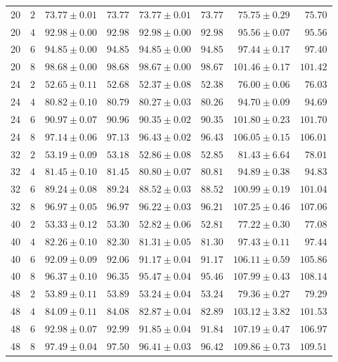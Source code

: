 \documentclass{article}
\theoremstyle{definition}
\theoremstyle{remark}
\begin{document}
\begin{table}[ht]
\begin{tabular}{llrrrrrr}
    20 & $2$ & $73.77 \pm 0.01$ & $73.77$ & $73.77 \pm 0.01$ & $73.77$ & $75.75 \pm 0.29$ & $75.70$ \\
    20 & $4$ & $92.98 \pm 0.00$ & $92.98$ & $92.98 \pm 0.00$ & $92.98$ & $95.56 \pm 0.07$ & $95.56$ \\
    20 & $6$ & $94.85 \pm 0.00$ & $94.85$ & $94.85 \pm 0.00$ & $94.85$ & $97.44 \pm 0.17$ & $97.40$ \\
    20 & $8$ & $98.68 \pm 0.00$ & $98.68$ & $98.67 \pm 0.00$ & $98.67$ & $101.46 \pm 0.17$ & $101.42$ \\
    24 & $2$ & $52.65 \pm 0.11$ & $52.68$ & $52.37 \pm 0.08$ & $52.38$ & $76.00 \pm 0.06$ & $76.03$ \\
    24 & $4$ & $80.82 \pm 0.10$ & $80.79$ & $80.27 \pm 0.03$ & $80.26$ & $94.70 \pm 0.09$ & $94.69$ \\
    24 & $6$ & $90.97 \pm 0.07$ & $90.96$ & $90.35 \pm 0.02$ & $90.35$ & $101.80 \pm 0.23$ & $101.70$ \\
    24 & $8$ & $97.14 \pm 0.06$ & $97.13$ & $96.43 \pm 0.02$ & $96.43$ & $106.05 \pm 0.15$ & $106.01$ \\
    32 & $2$ & $53.19 \pm 0.09$ & $53.18$ & $52.86 \pm 0.08$ & $52.85$ & $81.43 \pm 6.64$ & $78.01$ \\
    32 & $4$ & $81.45 \pm 0.10$ & $81.45$ & $80.80 \pm 0.07$ & $80.81$ & $94.89 \pm 0.38$ & $94.83$ \\
    32 & $6$ & $89.24 \pm 0.08$ & $89.24$ & $88.52 \pm 0.03$ & $88.52$ & $100.99 \pm 0.19$ & $101.04$ \\
    32 & $8$ & $96.97 \pm 0.05$ & $96.97$ & $96.22 \pm 0.03$ & $96.21$ & $107.25 \pm 0.46$ & $107.06$ \\
    40 & $2$ & $53.33 \pm 0.12$ & $53.30$ & $52.82 \pm 0.06$ & $52.81$ & $77.22 \pm 0.30$ & $77.08$ \\
    40 & $4$ & $82.26 \pm 0.10$ & $82.30$ & $81.31 \pm 0.05$ & $81.30$ & $97.43 \pm 0.11$ & $97.44$ \\
    40 & $6$ & $92.09 \pm 0.09$ & $92.06$ & $91.17 \pm 0.04$ & $91.17$ & $106.11 \pm 0.59$ & $105.86$ \\
    40 & $8$ & $96.37 \pm 0.10$ & $96.35$ & $95.47 \pm 0.04$ & $95.46$ & $107.99 \pm 0.43$ & $108.14$ \\
    48 & $2$ & $53.89 \pm 0.11$ & $53.89$ & $53.24 \pm 0.04$ & $53.24$ & $79.36 \pm 0.27$ & $79.29$ \\
    48 & $4$ & $84.09 \pm 0.11$ & $84.08$ & $82.87 \pm 0.04$ & $82.89$ & $103.12 \pm 3.82$ & $101.53$ \\
    48 & $6$ & $92.98 \pm 0.07$ & $92.99$ & $91.85 \pm 0.04$ & $91.84$ & $107.19 \pm 0.47$ & $106.97$ \\
    48 & $8$ & $97.49 \pm 0.04$ & $97.50$ & $96.41 \pm 0.03$ & $96.42$ & $109.86 \pm 0.73$ & $109.51$ \\
    \bottomrule
  \end{tabular}
\end{table}
\end{document}
